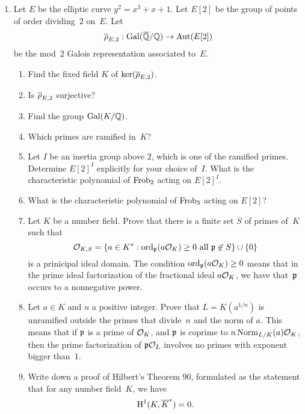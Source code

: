 \begin{enumerate}
\item{}  Let $E$ be the elliptic curve $y^2=x^3+x+1$.  Let 
$E[2]$  be the group of points of order dividing~$2$ on~$E$.  Let 
$$
\overline{\rho}_{E,2}:\operatorname{Gal}(\overline{\mathbb{Q}}/\mathbb{Q}) \to \operatorname{Aut}(E[2])
$$
be the mod~$2$ Galois representation associated to~$E$.
\begin{enumerate}
\item Find the fixed field $K$ of $\ker(\overline{\rho}_{E,2})$.
\item Is $\overline{\rho}_{E,2}$ surjective?
\item Find the group $\operatorname{Gal}(K/\mathbb{Q})$.
\item Which primes are ramified in~$K$?
\item Let $I$ be an inertia group above $2$, which is one
of the ramified primes.   Determine $E[2]^I$ explicitly
for your choice of~$I$.  What is the characteristic polynomial
of $\operatorname{Frob}_2$ acting on $E[2]^I$.
\item What is the characteristic polynomial of $\operatorname{Frob}_3$ acting
on $E[2]$?



\item Let $K$ be a number field.  Prove that there is a finite
set $S$ of primes of~$K$ such that 
$$
 \mathcal{O}_{K,S} = \{a \in K^* :  \operatorname{ord}_{\mathfrak{p}}(a\mathcal{O}_K) \geq 0 \text{ all } \mathfrak{p}\not\in S\}
    \cup\{0\}
$$
is a prinicipal ideal domain.  The condition $ \operatorname{ord}_{\mathfrak{p}}(a\mathcal{O}_K) \geq 0$
means that in the prime ideal factorization of the fractional ideal
$a\mathcal{O}_K$, we have that~$\mathfrak{p}$ occurs to a nonnegative power.  

\item Let $a \in K$ and $n$ a positive integer.  Prove that $L =
  K(a^{1/n})$ is unramified outside the primes that divide~$n$ and the
  norm of $a$.  This means that if $\mathfrak{p}$ is a prime of $\mathcal{O}_K$, and $\mathfrak{p}$
  is coprime to $n\operatorname{Norm}_{L/K}(a)\mathcal{O}_K$, then the prime factorization of
  $\mathfrak{p}\mathcal{O}_L$ involves no primes with exponent bigger than~$1$.

\item Write down a proof of Hilbert's Theorem 90, formulated
as the statement that for any number field~$K$, we have
$$
 \operatorname{H}^1(K,\overline{K}^*)=0.
$$

\end{enumerate}
\end{enumerate}


